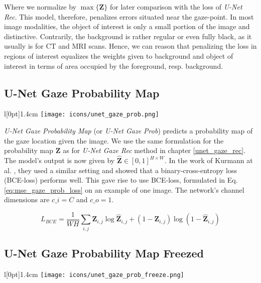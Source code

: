Where we normalize by $\max{\{\boldsymbol{Z}\}}$ for later comparison with the loss of \textit{U-Net Rec}. This model, therefore, penalizes errors situated near the gaze-point. In most image modalities, the object of interest is only a small portion of the image and distinctive. Contrarily, the background is rather regular or even fully black, as it usually is for CT and MRI scans. Hence, we can reason that penalizing the loss in regions of interest equalizes the weights given to background and object of interest in terms of area occupied by the foreground, resp. background.

\subsection{U-Net Gaze Probability Map} \label{unet_gaze_prob_map}
\begingroup
\setlength\intextsep{0pt}
\begin{wrapfigure}[4]{l}[0pt]{1.4cm}
\texttt{[image: icons/unet\_gaze\_prob.png]}
\end{wrapfigure}

\textit{U-Net Gaze Probability Map} (or \textit{U-Net Gaze Prob}) predicts a probability map of the gaze location given the image. We use the same formulation for the probability map $\boldsymbol{Z}$ as for \textit{U-Net Gaze Rec} method in chapter \ref{unet_gaze_rec}. The model's output is now given by $\boldsymbol{\hat{Z}} \in [0,1]^{H \times W}$. In the work of Kurmann at al. \cite{kurmann17}, they used a similar setting and showed that a binary-cross-entropy loss (BCE-loss) performs well. This gave rise to use BCE-loss, formulated in Eq. \ref{eq:mse_gaze_prob_loss} on an example of one image. The network's channel dimensions are $c\_i=C$ and $c\_o=1$.

\endgroup
\begin{equation}
L_{BCE} = \frac{1}{W H} \sum_{i,j} \boldsymbol{Z}_{i,j} \log{\boldsymbol{\hat{Z}}_{i,j}} + (1-\boldsymbol{Z}_{i,j}) \log{(1-\boldsymbol{\hat{Z}}_{i,j})}
\label{eq:mse_gaze_prob_loss}
\end{equation}
\hspace{6pt}

\clearpage
\subsection{U-Net Gaze Probability Map Freezed}
\begingroup
\setlength\intextsep{0pt}
\begin{wrapfigure}[4]{l}[0pt]{1.4cm}
\texttt{[image: icons/unet\_gaze\_prob\_freeze.png]}
\end{wrapfigure}

